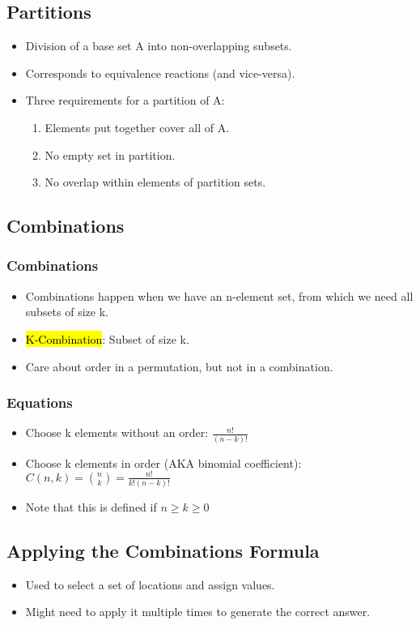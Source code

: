 \subsection{Partitions}
\begin{itemize}
    \item Division of a base set A into non-overlapping subsets.
    \item Corresponds to equivalence reactions (and vice-versa).
    \item Three requirements for a partition of A:
    \begin{enumerate}
        \item Elements put together cover all of A.
        \item No empty set in partition.
        \item No overlap within elements of partition sets.
    \end{enumerate}
\end{itemize}

\subsection{Combinations}
\subsubsection{Combinations}
\begin{itemize}
    \item Combinations happen when we have an n-element set, from which we need all subsets of size k.
    \item \hl{K-Combination}: Subset of size k.
    \item Care about order in a permutation, but not in a combination.
\end{itemize}

\subsubsection{Equations}
\begin{itemize}
    \item Choose k elements without an order: $\frac{n!}{(n-k)!}$
    \item Choose k elements in order (AKA binomial coefficient): $C(n,k)={n \choose k}=\frac{n!}{k!(n-k)!}$
    \item Note that this is defined if $ n \geq k \geq 0 $
\end{itemize}

\subsection{Applying the Combinations Formula}
\begin{itemize}
    \item Used to select a set of locations and assign values.
    \item Might need to apply it multiple times to generate the correct answer.
\end{itemize}

